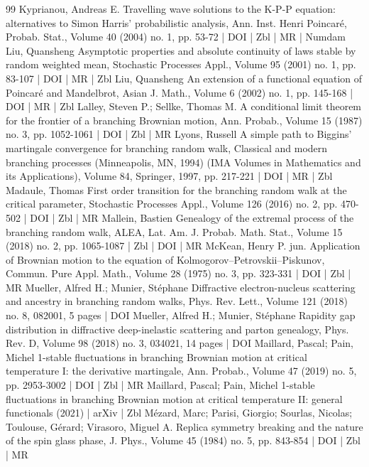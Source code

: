 \documentclass[10pt]{amsart}
\theoremstyle{definition}\newtheorem{defi}[theo]{Definition}\newtheorem{rema}[theo]{Remark}\newtheorem{exam}[theo]{Example}\newtheorem{exem}[theo]{Example}\newtheorem{nota}[theo]{Notation}
\newcommand\1{\mathds{1}}
\begin{document}
\begin{thebibliography}{99}
 Kyprianou, Andreas E. Travelling wave solutions to the K-P-P equation: alternatives to Simon Harris’ probabilistic analysis, Ann. Inst. Henri Poincaré, Probab. Stat., Volume 40 (2004) no. 1, pp. 53-72 | DOI | Zbl | MR | Numdam
 Liu, Quansheng Asymptotic properties and absolute continuity of laws stable by random weighted mean, Stochastic Processes Appl., Volume 95 (2001) no. 1, pp. 83-107 | DOI | MR | Zbl
 Liu, Quansheng An extension of a functional equation of Poincaré and Mandelbrot, Asian J. Math., Volume 6 (2002) no. 1, pp. 145-168 | DOI | MR | Zbl
 Lalley, Steven P.; Sellke, Thomas M. A conditional limit theorem for the frontier of a branching Brownian motion, Ann. Probab., Volume 15 (1987) no. 3, pp. 1052-1061 | DOI | Zbl | MR
 Lyons, Russell A simple path to Biggins’ martingale convergence for branching random walk, Classical and modern branching processes (Minneapolis, MN, 1994) (IMA Volumes in Mathematics and its Applications), Volume 84, Springer, 1997, pp. 217-221 | DOI | MR | Zbl
 Madaule, Thomas First order transition for the branching random walk at the critical parameter, Stochastic Processes Appl., Volume 126 (2016) no. 2, pp. 470-502 | DOI | Zbl | MR
 Mallein, Bastien Genealogy of the extremal process of the branching random walk, ALEA, Lat. Am. J. Probab. Math. Stat., Volume 15 (2018) no. 2, pp. 1065-1087 | Zbl | DOI | MR
 McKean, Henry P. jun. Application of Brownian motion to the equation of Kolmogorov–Petrovskii–Piskunov, Commun. Pure Appl. Math., Volume 28 (1975) no. 3, pp. 323-331 | DOI | Zbl | MR
 Mueller, Alfred H.; Munier, Stéphane Diffractive electron-nucleus scattering and ancestry in branching random walks, Phys. Rev. Lett., Volume 121 (2018) no. 8, 082001, 5 pages | DOI
 Mueller, Alfred H.; Munier, Stéphane Rapidity gap distribution in diffractive deep-inelastic scattering and parton genealogy, Phys. Rev. D, Volume 98 (2018) no. 3, 034021, 14 pages | DOI
 Maillard, Pascal; Pain, Michel 1-stable fluctuations in branching Brownian motion at critical temperature I: the derivative martingale, Ann. Probab., Volume 47 (2019) no. 5, pp. 2953-3002 | DOI | Zbl | MR
 Maillard, Pascal; Pain, Michel 1-stable fluctuations in branching Brownian motion at critical temperature II: general functionals (2021) | arXiv | Zbl
 Mézard, Marc; Parisi, Giorgio; Sourlas, Nicolas; Toulouse, Gérard; Virasoro, Miguel A. Replica symmetry breaking and the nature of the spin glass phase, J. Phys., Volume 45 (1984) no. 5, pp. 843-854 | DOI | Zbl | MR

\end{thebibliography}
\end{document}
